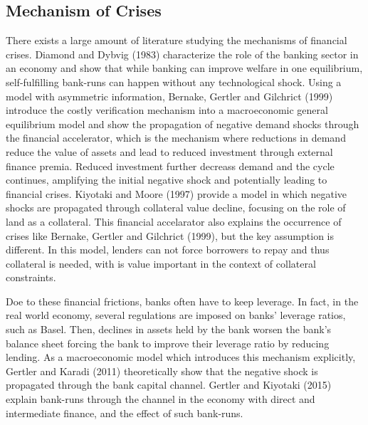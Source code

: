 \documentclass[a4paper,12pt]{article}
\begin{document}
\subsection{Mechanism of Crises}
There exists a large amount of literature studying the mechanisms of financial crises. Diamond and Dybvig (1983) characterize the role of the banking sector in an economy and show that while banking can improve welfare in one equilibrium, self-fulfilling bank-runs can happen without any technological shock. Using a model with asymmetric information, Bernake, Gertler and Gilchrict (1999) introduce the costly verification mechanism into a macroeconomic general equilibrium model and show the propagation of negative demand shocks through the financial accelerator, which is the mechanism where reductions in demand reduce the value of assets and lead to reduced investment through external finance premia. Reduced investment further decreass demand and the cycle continues, amplifying the initial negative shock and potentially leading to financial crises. Kiyotaki and Moore (1997) provide a model in which negative shocks are propagated through collateral value decline, focusing on the role of land as a collateral. This financial accelarator also explains the occurrence of crises like Bernake, Gertler and Gilchrict (1999), but the key assumption is different. In this model, lenders can not force borrowers to repay and thus collateral is needed, with is value important in the context of collateral constraints. \par
Doe to these financial frictions, banks often have to keep leverage. In fact, in the real world economy, several regulations are imposed on banks' leverage ratios, such as Basel. Then, declines in assets held by the bank worsen the bank's balance sheet forcing the bank to improve their leverage ratio by reducing lending. As a macroeconomic model which introduces this mechanism explicitly, Gertler and Karadi (2011) theoretically show that the negative shock is propagated through the bank capital channel. Gertler and Kiyotaki (2015) explain bank-runs through the channel in the economy with direct and intermediate finance, and the effect of such bank-runs. \par
\end{document}
